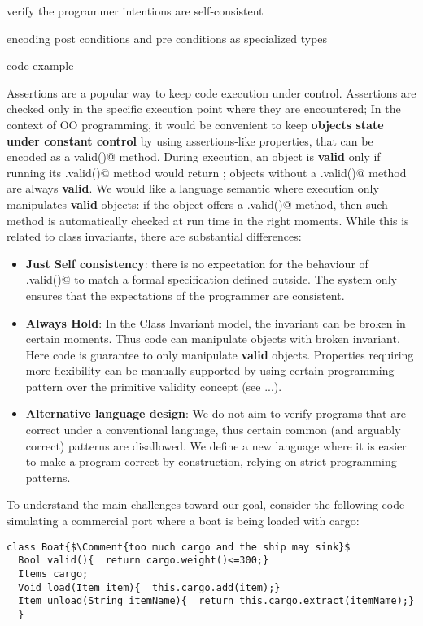verify the programmer intentions are self-consistent

encoding post conditions and pre conditions as specialized types

code example


Assertions are a popular way to keep code execution
under control. Assertions are checked only in the specific
execution point where they are encountered;
In the context of OO programming, it would be
convenient to keep \textbf{objects state
under constant control} by using assertions-like properties, that
can be encoded as a \Q@Bool valid()@ method.
During execution,
an object is \textbf{valid} only if running its
\Q@.valid()@ method would return \Q@true@;
objects without a \Q@.valid()@ method are always \textbf{valid}.
We would like a language semantic where 
execution only manipulates \textbf{valid} objects:
if the object offers a \Q@.valid()@ method, then such
 method is automatically checked at run time in the right moments.
While this is related to class invariants,
there are substantial differences:
\begin{itemize}
\item \textbf{Just Self consistency}: there is no expectation for
the behaviour of \Q@.valid()@ to match a formal specification defined outside.
The system only ensures that the expectations of the programmer are consistent.
\item \textbf{Always Hold}: 
In the Class Invariant model, the invariant can be broken in
certain moments. Thus code can manipulate objects with broken invariant.
Here code is guarantee to only manipulate \textbf{valid} objects.
Properties requiring more flexibility can be manually supported by
 using certain programming pattern over the primitive validity concept (see ...).
\item \textbf{Alternative language design}:
We do not aim to verify programs that are correct under a conventional language,
thus certain common (and arguably correct) patterns are disallowed.
We define a new language where it is easier to make a program correct by construction, relying on
strict programming patterns.
\end{itemize}

\noindent To understand the main challenges
toward our goal,
consider the following code 
simulating a commercial port
 where a boat is being loaded with cargo:
\saveSpace
\begin{lstlisting}
class Boat{$\Comment{too much cargo and the ship may sink}$
  Bool valid(){  return cargo.weight()<=300;}
  Items cargo;
  Void load(Item item){  this.cargo.add(item);}
  Item unload(String itemName){  return this.cargo.extract(itemName);}
  }
\end{lstlisting}
\saveSpace




